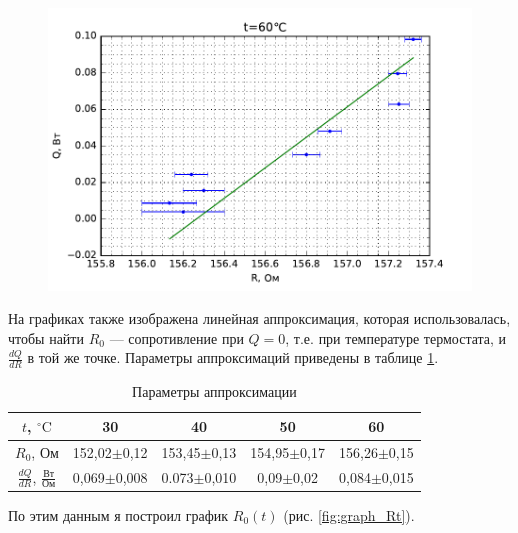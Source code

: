 \documentclass[12pt]{article}
\newcommand{\degC}{^\circ \text{C}}
\newcommand{\fref}[1]{рис. \ref{#1}}
\begin{document}
\begin{figure}[!h]
\begin{minipage}{0.5\linewidth}
			\includegraphics[scale=.6]{graph-QR3.pdf}
		\end{minipage}
	\end{figure}
	
	На графиках также изображена линейная аппроксимация, которая использовалась, чтобы найти $R_0$ --- сопротивление при $Q=0$, т.е. при температуре термостата, и $\frac{dQ}{dR}$ в той же точке. Параметры аппроксимаций приведены в таблице \ref{tb:approx_params}.
	
	\begin{table}[!h]
		\caption{Параметры аппроксимации}
		\label{tb:approx_params}
		\begin{center}
		\begin{tabular}{|c|cccc|}
			\hline
			$t$, $\degC$ & 30 & 40 & 50 & 60 \\
			\hline
			$R_0$, Ом & 152,02$\pm$0,12 & 153,45$\pm$0,13 & 154,95$\pm$0,17 & 156,26$\pm$0,15 \\
			$\frac{dQ}{dR}$, $\frac{\text{Вт}}{\text{Ом}}$ & 0,069$\pm$0,008 & 0.073$\pm$0,010 & 0,09$\pm$0,02 & 0,084$\pm$0,015 \\
			\hline
		\end{tabular}
		\end{center}
	\end{table}
	
	По этим данным я построил график $R_0(t)$ (\fref{fig:graph_Rt}).
	
\end{document}

